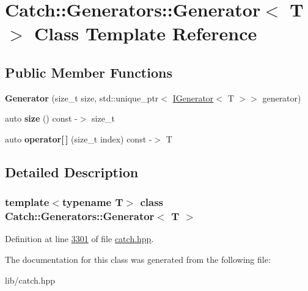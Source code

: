 \hypertarget{classCatch_1_1Generators_1_1Generator}{}\section{Catch\+::Generators\+::Generator$<$ T $>$ Class Template Reference}
\label{classCatch_1_1Generators_1_1Generator}
\subsection*{Public Member Functions}
\begin{DoxyCompactItemize}
\item 
\mbox{\label{classCatch_1_1Generators_1_1Generator_a3d992b33c5c1abb7370065c6ae10388f}} 
{\bfseries Generator} (size\+\_\+t size, std\+::unique\+\_\+ptr$<$ \mbox{\hyperlink{structCatch_1_1Generators_1_1IGenerator}{I\+Generator}}$<$ T $>$$>$ generator)
\item 
\mbox{\label{classCatch_1_1Generators_1_1Generator_a4ebea9a7448f8f374bc7cff5d7b63041}} 
auto {\bfseries size} () const -\/$>$ size\+\_\+t
\item 
\mbox{\label{classCatch_1_1Generators_1_1Generator_ad8835935e962baaf1fab6c6dcac83865}} 
auto {\bfseries operator\mbox{[}$\,$\mbox{]}} (size\+\_\+t index) const -\/$>$ T
\end{DoxyCompactItemize}


\subsection{Detailed Description}
\subsubsection*{template$<$typename T$>$\newline
class Catch\+::\+Generators\+::\+Generator$<$ T $>$}



Definition at line \mbox{\hyperlink{catch_8hpp_source_l03301}{3301}} of file \mbox{\hyperlink{catch_8hpp_source}{catch.\+hpp}}.



The documentation for this class was generated from the following file\+:\begin{DoxyCompactItemize}
\item 
lib/catch.\+hpp\end{DoxyCompactItemize}

